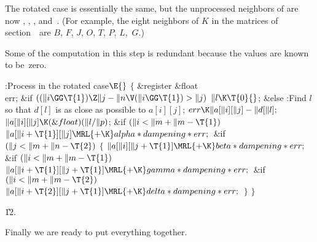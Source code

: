 The rotated case is essentially the same, but the
unprocessed
neighbors of  are now , , ,
and~. (For example, the eight neighbors of $K$
in
the matrices of section~\matrixsec\ are $B$, $F$, $J$, $O$, $T$, $P$,
$L$,~$G$.)

Some of the computation in this step is redundant because the values
are known to be~zero.

\Y\B\4:Process  in the rotated case\X${}\E{}$\6
${}\{{}$\5
\1\&{register} \&{float} \\{err};\7
\&{if} ${}((\|i\GG\T{1})\Z\|j-\|n\V(\|i\GG\T{1})>\|j){}$\1\5
${}\|l\K\T{0}{}$;\2\6
\&{else}\1\5
:Find $l$ so that $d[l]$ is as close as possible to $a[i][j]$\X;\2\6
${}\\{err}\K\|a[\|i][\|j]-\|d[\|l];{}$\6
${}\|a[\|i][\|j]\K(\&{float})(\|l/\|p){}$;\6
\&{if} ${}(\|i<\|m+\|m-\T{1}){}$\1\5
${}\|a[\|i+\T{1}][\|j]\MRL{+{\K}}\\{alpha}*\\{dampening}*\\{err};{}$\2\6
\&{if} ${}(\|j<\|m+\|n-\T{2}){}$\5
${}\{{}$\1\6
${}\|a[\|i][\|j+\T{1}]\MRL{+{\K}}\\{beta}*\\{dampening}*\\{err};{}$\6
\&{if} ${}(\|i<\|m+\|m-\T{1}){}$\1\5
${}\|a[\|i+\T{1}][\|j+\T{1}]\MRL{+{\K}}\\{gamma}*\\{dampening}*\\{err};{}$\2\6
\&{if} ${}(\|i<\|m+\|m-\T{2}){}$\1\5
${}\|a[\|i+\T{2}][\|j+\T{1}]\MRL{+{\K}}\\{delta}*\\{dampening}*\\{err};{}$\2\6
\4${}\}{}$\2\6
\4${}\}{}$\2\par
\U12.\fi

Finally we are ready to put everything together.

